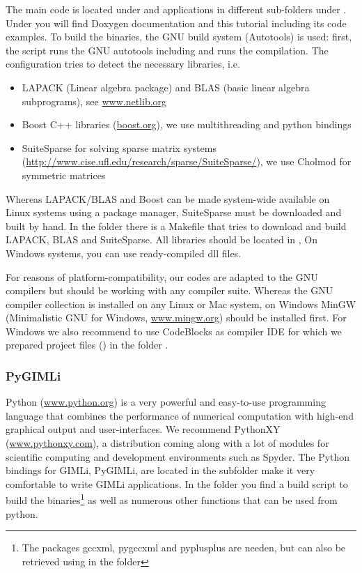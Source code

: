 The main code is located under  and applications in different sub-folders under .
Under  you will find Doxygen documentation and this tutorial including its code examples.
To build the binaries, the GNU build system (Autotools) is used: first, the script  runs the GNU autotools including  and  runs the compilation.
The configuration tries to detect the necessary libraries, i.e. 
\begin{itemize}
	\item LAPACK (Linear algebra package) and BLAS (basic linear algebra subprograms), see \url{www.netlib.org}
	\item Boost C++ libraries (\url{boost.org}), we use multithreading and python bindings 
	\item SuiteSparse for solving sparse matrix systems (\url{http://www.cise.ufl.edu/research/sparse/SuiteSparse/}), we use Cholmod for symmetric matrices
\end{itemize}
Whereas LAPACK/BLAS and Boost can be made system-wide available on Linux systems using a package manager, SuiteSparse must be downloaded and built by hand. 
In the folder  there is a Makefile that tries to download and build LAPACK, BLAS and SuiteSparse.
All libraries should be located in , 
On Windows systems, you can use ready-compiled dll files.

For reasons of platform-compatibility, our codes are adapted to the GNU compilers but should be working with any compiler suite.
Whereas the GNU compiler collection is installed on any Linux or Mac system, on Windows MinGW (Minimalistic GNU for Windows, \url{www.mingw.org}) should be installed first.
For Windows we also recommend to use CodeBlocks as compiler IDE for which we prepared project files () in the folder .

\subsubsection*{PyGIMLi}
Python (\url{www.python.org}) is a very powerful and easy-to-use programming language that combines the performance of numerical computation with high-end graphical output and user-interfaces.
We recommend PythonXY (\url{www.pythonxy.com}), a distribution coming along with a lot of modules for scientific computing and development environments such as Spyder.
The Python bindings for GIMLi, PyGIMLi, are located in the subfolder  make it very comfortable to write GIMLi applications.
In the folder  you find a build script  to build the binaries\footnote{The packages gccxml, pygccxml and pyplusplus are needen, but can also be retrieved using  in the folder } as well as numerous other functions that can be used from python.

